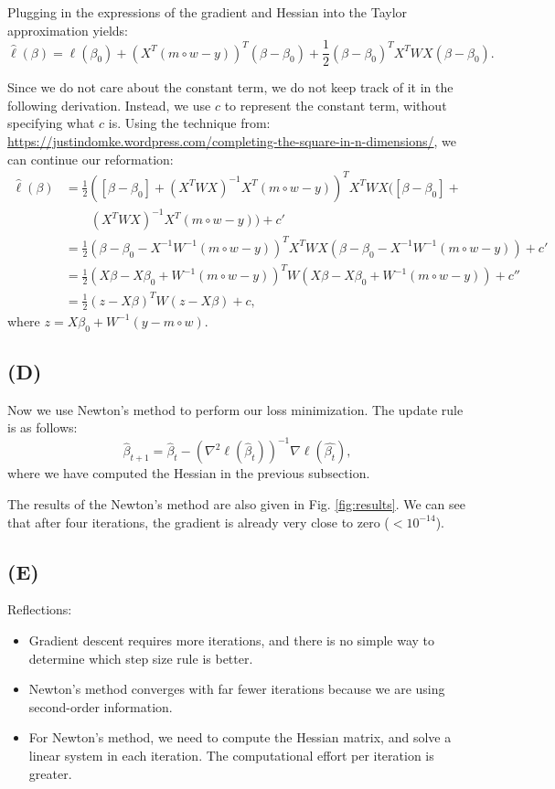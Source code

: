 \documentclass[a4paper,11pt]{article}
\begin{document}
Plugging in the expressions of the gradient and Hessian into the Taylor approximation yields:
$$
\hat{\ell}(\beta) = \ell(\beta_0) + (X^T(m\circ w-y))^T(\beta - \beta_0) + \frac{1}{2}(\beta - \beta_0)^T X^T W X (\beta - \beta_0).
		$$
		
Since we do not care about the constant term, we do not keep track of it in the following derivation. Instead, we use $c$ to represent the constant term, without specifying what $c$ is. Using the technique from: \url{https://justindomke.wordpress.com/completing-the-square-in-n-dimensions/}, we can continue our reformation:
\small
\begin{align*}
		\hat{\ell}(\beta) 
		&= \frac{1}{2} ( [ \beta - \beta_0 ] +(X^T W X)^{-1} X^T (m\circ w-y) )^T X^T W X ( [ \beta - \beta_0 ] +\\
		& \quad \quad (X^T W X)^{-1} X^T (m\circ w-y) ) + c' \\ 
		&= \frac{1}{2} (\beta - \beta_0 - X^{-1}W^{-1} (m\circ w-y) )^T X^T W X (\beta - \beta_0 - X^{-1}W^{-1} (m\circ w-y) ) + c' \\
		&= \frac{1}{2} (X\beta - X\beta_0 + W^{-1} (m\circ w-y) )^T W (X\beta - X\beta_0 + W^{-1} (m\circ w-y) ) + c'' \\
		&= \frac{1}{2}(z-X\beta)^T W (z-X\beta) + c,
	\end{align*}
where $z = X\beta_0 + W^{-1}(y-m\circ w)$.

\subsection{(D)}

Now we use Newton's method to perform our loss minimization. The update rule is as follows:
$$
	\hat{\beta}_{t+1} = \hat{\beta}_t - (\nabla^2\ell(\hat{\beta}_t))^{-1}\nabla\ell(\hat{\beta_t}),
$$
where we have computed the Hessian in the previous subsection.

The results of the Newton's method are also given in Fig. \ref{fig:results}. We can see that after four iterations, the gradient is already very close to zero ($< 10^{-14}$).

\subsection{(E)}

Reflections:
\begin{itemize}
	\item Gradient descent requires more iterations, and there is no simple way to determine which step size rule is better. 
	\item Newton's method converges with far fewer iterations because we are using second-order information. 
	\item For Newton's method, we need to compute the Hessian matrix, and solve a linear system in each iteration. The computational effort per iteration is greater.
\end{itemize}






%
%
\end{document}
